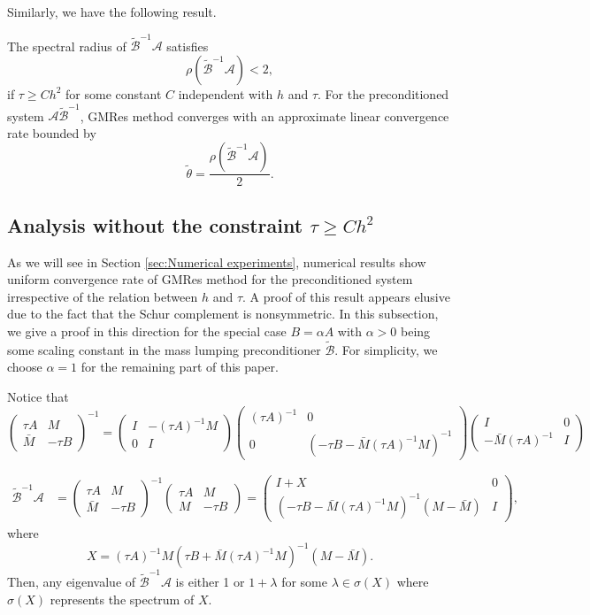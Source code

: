 \documentclass[smallcondensed]{svjour3}
\numberwithin{equation}{section} \numberwithin{table}{section}
\numberwithin{figure}{section}
\numberwithin{algorithm}{section}
\begin{document}
Similarly, we have the following result.
\begin{corollary} \label{convergence-for-tildeBA}
The spectral radius of $\tilde{\mathcal{B}}^{-1}\mathcal{A}$ satisfies
$$
\rho(\tilde{\mathcal{B}}^{-1}\mathcal{A})<2,
$$
if ${\tau}\geq Ch^2$ for some constant $C$ independent with $h$ and $\tau$. For the preconditioned system $\mathcal{A}\tilde{\mathcal{B}}^{-1}$, GMRes method converges with an approximate linear convergence rate bounded by 
$$
\tilde{\theta} = \frac{\rho(\tilde{\mathcal{B}}^{-1}\mathcal{A})}{2}.
$$
\end{corollary}

\subsection{Analysis without the constraint $\tau\geq Ch^2$} As we will see in Section \ref{sec:Numerical experiments}, numerical results show uniform convergence rate of GMRes method for the preconditioned system irrespective of the relation between $h$ and $\tau$. A proof of this result appears elusive due to the fact that the Schur complement is nonsymmetric. In this subsection, we give a proof in this direction for the special case $B = \alpha A$ with $\alpha>0$ being some scaling constant in the mass lumping preconditioner $\tilde{\mathcal{B}}$. For simplicity, we choose $\alpha=1$ for the remaining part of this paper.

Notice that 
$$
\begin{pmatrix}
 \tau A&M\\
 \bar{M}&-\tau B 
\end{pmatrix}^{-1}
=
\begin{pmatrix}
 I&-(\tau A)^{-1}M\\
 0&I 
\end{pmatrix}
\begin{pmatrix}
 (\tau A)^{-1}&0\\
 0&(-\tau B-\bar{M}(\tau A)^{-1}M)^{-1} 
\end{pmatrix}
\begin{pmatrix}
 I&0\\
 -\bar{M}(\tau A)^{-1}&I 
\end{pmatrix}
$$

\begin{align*}
\tilde{\mathcal{B}}^{-1}\mathcal{A} &= 
\begin{pmatrix}
 \tau A&M\\
 \bar{M}&-\tau B 
\end{pmatrix}^{-1}
\begin{pmatrix}
 \tau A&{M}\\
 M&-\tau B 
\end{pmatrix}
=\begin{pmatrix}
 I+X&0\\
 (-\tau B-\bar{M}(\tau A)^{-1}M)^{-1}({M}-\bar M)&I 
\end{pmatrix}, \end{align*}
where
$$
X = (\tau A)^{-1}M(\tau B+\bar{M}(\tau A)^{-1}M)^{-1}({M}-\bar M).
$$
Then, any eigenvalue of $\tilde{\mathcal{B}}^{-1}\mathcal{A}$ is either 1 or $1+\lambda$ for some $\lambda \in\sigma(X)$ where $\sigma(X)$ represents the spectrum of $X$.
\end{document}
